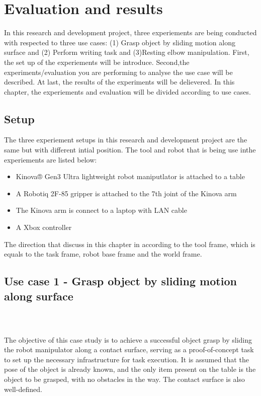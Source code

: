 \documentclass[report.tex]{subfiles}
\begin{document}
\chapter{Evaluation and results}
In this research and development project, three experiements are being conducted with respected to three use cases: (1) Grasp object by sliding motion along surface and (2) Perform writing task and (3)Resting elbow manipulation. First, the set up of the experiements will be introduce. Second,the experiments/evaluation you are performing to analyse the use case will be described. At last, the results of the experiments will be delievered. In this chapter, the experiements and evaluation will be divided according to use cases.
    \section{Setup}
    The three experiement setups in this research and development project are the same but with different intial position.
    The tool and robot that is being use inthe experiements are listed below:
    \begin{itemize}
        \item Kinova® Gen3 Ultra lightweight robot maniputlator is attached to a table
        \item A Robotiq 2F-85 gripper is attached to the 7th joint of the Kinova arm
        \item The Kinova arm is connect to a laptop with LAN cable
        \item A Xbox controller
    \end{itemize}
    The direction that discuss in this chapter in according to the tool frame, which is equals to the task frame, robot base frame and the world frame.

    \section{Use case 1 - Grasp object by sliding motion along surface}
    \paragraph{\\}
    The objective of this case study is to achieve a successful object grasp by sliding the robot manipulator along a contact surface, serving as a proof-of-concept task to set up the necessary infrastructure for task execution. It is assumed that the pose of the object is already known, and the only item present on the table is the object to be grasped, with no obstacles in the way. The contact surface is also well-defined.
\end{document}
